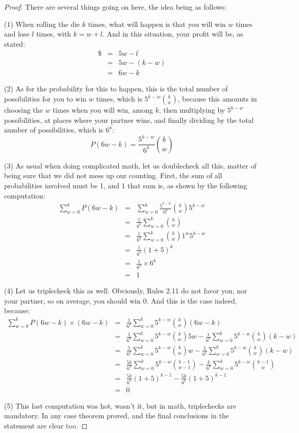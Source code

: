 \documentclass[12pt]{amsbook}
\begin{document}
\begin{proof}
There are several things going on here, the idea being as follows:

\medskip

(1) When rolling the die $k$ times, what will happen is that you will win $w$ times and lose $l$ times, with $k=w+l$. And in this situation, your profit will be, as stated:
\begin{eqnarray*}
\$
&=&5w-l\\
&=&5w-(k-w)\\
&=&6w-k
\end{eqnarray*}

(2) As for the probability for this to happen, this is the total number of possibilities for you to win $w$ times, which is $5^{k-w}\binom{k}{w}$, because this amounts in choosing the $w$ times when you will win, among $k$, then multiplying by $5^{k-w}$ possibilities, at places where your partner wins, and finally dividing by the total number of possibilities, which is $6^k$:
$$P(6w-k)=\frac{5^{k-w}}{6^k}\binom{k}{w}$$

(3) As usual when doing complicated math, let us doublecheck all this, matter of being sure that we did not mess up our counting. First, the sum of all probabilities involved must be 1, and 1 that sum is, as shown by the following computation:
\begin{eqnarray*}
\sum_{w=0}^kP(6w-k)
&=&\sum_{w=0}^k\frac{5^{k-w}}{6^k}\binom{k}{w}5^{k-w}\\
&=&\frac{1}{6^k}\sum_{w=0}^k\binom{k}{w}\\
&=&\frac{1}{6^k}\sum_{w=0}^k\binom{k}{w}1^w5^{k-w}\\
&=&\frac{1}{6^k}(1+5)^k\\
&=&\frac{1}{6^k}\times 6^k\\
&=&1
\end{eqnarray*}

(4) Let us triplecheck this as well. Obviously, Rules 2.11 do not favor you, nor your partner, so on average, you should win 0. And this is the case indeed, because:
\begin{eqnarray*}
\sum_{w=0}^kP(6w-k)\times(6w-k)
&=&\frac{1}{6^k}\sum_{w=0}^k5^{k-w}\binom{k}{w}(6w-k)\\
&=&\frac{1}{6^k}\sum_{w=0}^k5^{k-w}\binom{k}{w}5w-\frac{1}{6^k}\sum_{w=0}^k5^{k-w}\binom{k}{w}(k-w)\\
&=&\frac{5}{6^k}\sum_{w=0}^k5^{k-w}\binom{k}{w}w-\frac{1}{6^k}\sum_{w=0}^k5^{k-w}\binom{k}{w}(k-w)\\
&=&\frac{5k}{6^k}\sum_{w=0}^k5^{k-w}\binom{k-1}{w-1}-\frac{k}{6^k}\sum_{w=0}^k5^{k-w}\binom{k-1}{w}\\
&=&\frac{5k}{6^k}(1+5)^{k-1}-\frac{5k}{6^k}(1+5)^{k-1}\\
&=&0
\end{eqnarray*}

(5) This last computation was hot, wasn't it, but in math, triplechecks are mandatory. In any case theorem proved, and the final conclusions in the statement are clear too.
\end{proof}
\end{document}
